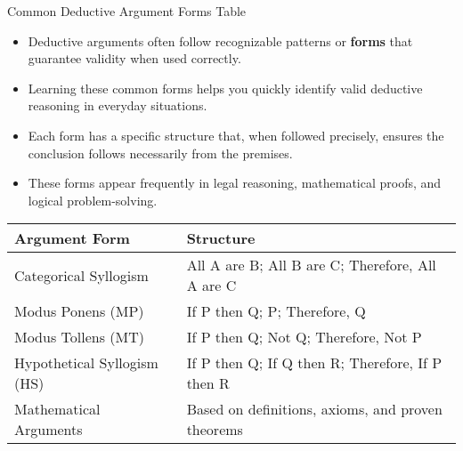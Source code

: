 \documentclass{beamer}
\begin{document}
	\begin{frame}{Common Deductive Argument Forms Table}
		\begin{itemize}
			\item Deductive arguments often follow recognizable patterns or \textbf{forms} that guarantee validity when used correctly.
			\item Learning these common forms helps you quickly identify valid deductive reasoning in everyday situations.
			\item Each form has a specific structure that, when followed precisely, ensures the conclusion follows necessarily from the premises.
			\item These forms appear frequently in legal reasoning, mathematical proofs, and logical problem-solving.
		\end{itemize}
		
		\begin{table}[h]
			\centering
			\scriptsize
			\begin{tabular}{|l|l|}
				\hline
				\textbf{Argument Form} & \textbf{Structure} \\
				\hline
				Categorical Syllogism & All A are B; All B are C; Therefore, All A are C \\
				\hline
				Modus Ponens (MP) & If P then Q; P; Therefore, Q \\
				\hline
				Modus Tollens (MT) & If P then Q; Not Q; Therefore, Not P \\
				\hline
				Hypothetical Syllogism (HS) & If P then Q; If Q then R; Therefore, If P then R \\
				\hline
				Mathematical Arguments & Based on definitions, axioms, and proven theorems \\
				\hline
			\end{tabular}
		\end{table}
	\end{frame}
	
\end{document}
